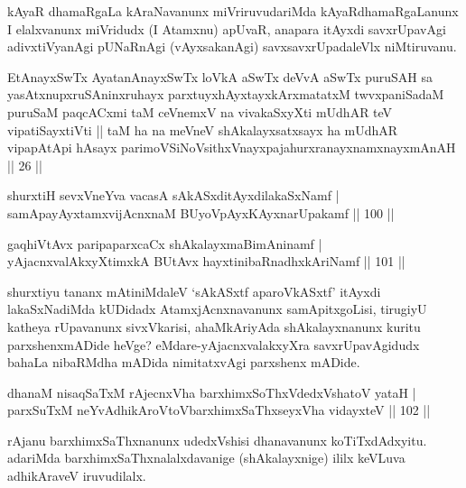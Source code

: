 \begin{artha}
kAyaR dhamaRgaLa kAraNavanunx miVriruvudariMda kAyaRdhamaRgaLanunx I elalxvanunx miVridudx (I Atamxnu) apUvaR, anapara itAyxdi savxrUpavAgi adivxtiVyanAgi pUNaRnAgi (vAyxsakanAgi) savxsavxrUpadaleVlx niMtiruvanu.
\end{artha}

\begin{shl}
EtAnayxSwTx AyatanAnayxSwTx loVkA aSwTx deVvA aSwTx puruSAH sa yasAtxnupxruSAninxruhayx parxtuyxhAyxtayxkArxmatatxM twvxpaniSadaM puruSaM paqcACxmi taM ceVnemxV na vivakaSxyXti mUdhAR teV vipatiSayxtiVti || taM ha na meVneV shAkalayxsatxsayx ha mUdhAR vipapAtApi hAsayx parimoVSiNoV\s sithxVnayxpajahurxranayxnamxnayxmAnAH || 26 ||
\end{shl}

\begin{shl}
shurxtiH sevxVneYva vacasA sAkASxditAyxdilakaSxNamf |\\
samApayAyx\s \s tamxvijAcnxnaM BUyoV\s pAyxKAyxnarUpakamf \hfill || 100 ||
\end{shl}

\begin{shl}
gaqhiVtAvx paripaparxcaCx shAkalayxmaBimAninamf |\\
yAjacnxvalAkxyXtimxkA BUtAvx hayxtinibaRnadhxkAriNamf \hfill || 101 ||
\end{shl}

\begin{artha}%
shurxtiyu tananx mAtiniMdaleV `sAkASxtf aparoVkASxtf' itAyxdi lakaSxNadiMda kUDidadx AtamxjAcnxnavanunx samApitxgoLisi, tirugiyU katheya rUpavanunx sivxVkarisi, ahaMkAriyAda shAkalayxnanunx kuritu parxshenxmADide heVge? eMdare-yAjacnxvalakxyXra savxrUpavAgidudx bahaLa nibaRMdha mADida nimitatxvAgi parxshenx mADide.
\end{artha}


\begin{shl}
dhanaM nisaqSaTxM rAjecnxVha barxhimxSoThxVdedxVshatoV yataH |\\
parxSuTxM neYvAdhikAroV\s toV\s barxhimxSaThxseyxVha vidayxteV \hfill || 102 ||
\end{shl}

\begin{artha}
rAjanu barxhimxSaThxnanunx udedxVshisi dhanavanunx koTiTxdAdxyitu. adariMda barxhimxSaThxnalalxdavanige (shAkalayxnige) ililx keVLuva adhikAraveV iruvudilalx.
\end{artha}

